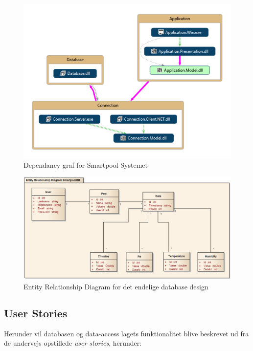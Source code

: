 \begin{figure}[H]
	\centering
	\includegraphics[width=0.8\linewidth]{figs/design/vs_codeMap.PNG}
	\caption{Dependancy graf for Smartpool Systemet}
	\label{fig:vs_codeMap}
\end{figure}

\begin{figure}
\centering
\includegraphics[width=0.7\linewidth]{figs/databaseERD_final_uml}
\caption{Entity Relationship Diagram for det endelige database design}
\label{fig:databaseERD_final_uml}
\end{figure}


\subsection{User Stories}
Herunder vil databasen og data-access lagets funktionalitet blive beskrevet ud fra de undervejs opstillede \textit{user stories}, herunder:

